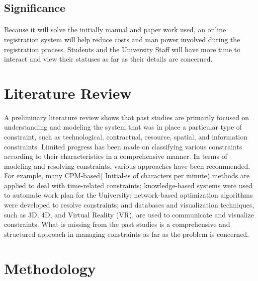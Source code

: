 \documentclass[12pt]{article}
\begin{document}
	\subsection{Significance}
		\paragraph{}
	 Because it will solve the initially manual and paper work used, an online registration system will help reduce costs and man power involved during the registration process.
	Students and the University Staff will have more time to interact and view their statuses as far as their details are concerned.
		\maketitle
	\section{Literature Review}
		\paragraph{}
	A preliminary literature review shows that past studies are primarily
	focused on understanding and modeling the system that was in place a particular type of constraint, such as technological, \cite{DUMMY:1}contractual, resource, spatial, and information constraints. Limited progress has been made on classifying various constraints according \cite{ARTICLE:1}to their characteristics in a comprehensive manner. In terms of modeling and resolving constraints, various approaches have been recommended. For example, many CPM-based( Initial-is of characters per minute)\cite{BOOK:1} methods are applied to deal with time-related constraints; knowledge-based systems were used to automate work plan for the University; network-based optimization algorithms were developed to resolve constraints; and databases and visualization techniques, such as 3D, 4D,\cite{WEBSITE:1} and Virtual Reality (VR), are used to communicate and visualize constraints. What is missing from the past studies is a comprehensive and structured approach in managing constraints as far as the problem is concerned.
		\maketitle
	\section{Methodology}
\end{document}

